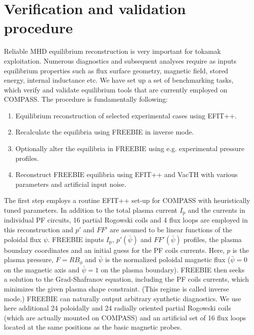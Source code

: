
\section{Verification and validation procedure} %
\label{sec:procedure}

Reliable MHD equilibrium reconstruction is very important for tokamak exploitation. Numerous diagnostics and subsequent analyses require as inputs equilibrium properties such as flux surface geometry, magnetic field, stored energy, internal inductance etc. We have set up a set of benchmarking tasks, which verify and validate equilibrium tools that are currently employed on COMPASS. The procedure is fundamentally following:

\begin{enumerate}
	\item Equilibrium reconstruction of selected experimental cases using EFIT++.
	\item Recalculate the equilibria using FREEBIE in inverse mode.
	\item Optionally alter the equilibria in FREEBIE using e.g. experimental pressure profiles.
	\item Reconstruct FREEBIE equilibria using EFIT++ and VacTH with various parameters and artificial input noise.
\end{enumerate}

The first step employs a routine EFIT++ set-up for COMPASS with heuristically tuned parameters. In addition to the total plasma current $I_\mathrm{p}$ and the currents in individual PF circuits, 16 partial Rogowski coils and 4 flux loops are employed in this reconstruction and $p'$ and $FF'$ are assumed to be linear functions of the poloidal flux $\psi$.
FREEBIE inputs $I_\mathrm{p}$, $p'\left( {\bar \psi } \right)$ and $FF'\left( {\bar \psi } \right)$ profiles, the plasma boundary coordinates and an initial guess for the PF coils currents. Here, $p$ is the plasma pressure, $F = RB_\phi$ and $\bar\psi$ is the normalized poloidal magnetic flux ($\bar\psi = 0$ on the magnetic axis and $\bar\psi = 1$ on the plasma boundary). FREEBIE then seeks a solution to the Grad-Shafranov equation, including the PF coils currents, which minimizes the given plasma shape constraint. (This regime is called inverse mode.) FREEBIE can naturally output arbitrary synthetic diagnostics. We use here additional 24 poloidally and 24 radially oriented partial Rogowski coils (which are actually mounted on COMPASS) and an artificial set of 16 flux loops located at the same positions as the basic magnetic probes.

